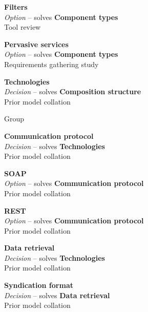 \textbf{Filters} \\ \emph{Option} -- solves \textbf{Component types} \\ Tool review

\textbf{Pervasive services} \\ \emph{Option} -- solves \textbf{Component types} \\ Requirements gathering study

\textbf{Technologies} \\ \emph{Decision} -- solves \textbf{Composition structure} \\ Prior model collation

Group

\textbf{Communication protocol} \\ \emph{Decision} -- solves \textbf{Technologies} \\ Prior model collation \cite{Minhas2012}


\textbf{SOAP} \\ \emph{Option} -- solves \textbf{Communication protocol} \\ Prior model collation \cite{Minhas2012}

\textbf{REST} \\ \emph{Option} -- solves \textbf{Communication protocol} \\ Prior model collation \cite{Minhas2012}

\textbf{Data retrieval} \\ \emph{Decision} -- solves \textbf{Technologies} \\ Prior model collation \cite{Minhas2012}


\textbf{Syndication format} \\ \emph{Decision} -- solves \textbf{Data retrieval} \\ Prior model collation \cite{Minhas2012}


